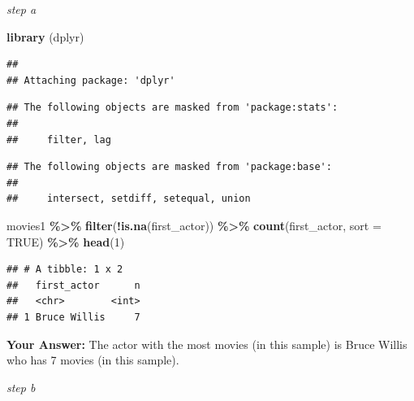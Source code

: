 \documentclass[
]{article}
\newenvironment{Shaded}{\begin{snugshade}}{\end{snugshade}}
\newcommand{\AttributeTok}[1]{\textcolor[rgb]{0.13,0.29,0.53}{#1}}
\newcommand{\ConstantTok}[1]{\textcolor[rgb]{0.56,0.35,0.01}{#1}}
\newcommand{\DecValTok}[1]{\textcolor[rgb]{0.00,0.00,0.81}{#1}}
\newcommand{\FunctionTok}[1]{\textcolor[rgb]{0.13,0.29,0.53}{\textbf{#1}}}
\newcommand{\NormalTok}[1]{#1}
\newcommand{\OtherTok}[1]{\textcolor[rgb]{0.56,0.35,0.01}{#1}}
\newcommand{\SpecialCharTok}[1]{\textcolor[rgb]{0.81,0.36,0.00}{\textbf{#1}}}
\newcommand{\StringTok}[1]{\textcolor[rgb]{0.31,0.60,0.02}{#1}}
\begin{document}
\emph{step a}

\begin{Shaded}
\begin{Highlighting}[]
\FunctionTok{library}\NormalTok{ (dplyr)}
\end{Highlighting}
\end{Shaded}

\begin{verbatim}
## 
## Attaching package: 'dplyr'
\end{verbatim}

\begin{verbatim}
## The following objects are masked from 'package:stats':
## 
##     filter, lag
\end{verbatim}

\begin{verbatim}
## The following objects are masked from 'package:base':
## 
##     intersect, setdiff, setequal, union
\end{verbatim}

\begin{Shaded}
\begin{Highlighting}[]
\NormalTok{movies1 }\SpecialCharTok{\%\textgreater{}\%}
  \FunctionTok{filter}\NormalTok{(}\SpecialCharTok{!}\FunctionTok{is.na}\NormalTok{(first\_actor)) }\SpecialCharTok{\%\textgreater{}\%}
  \FunctionTok{count}\NormalTok{(first\_actor, }\AttributeTok{sort =} \ConstantTok{TRUE}\NormalTok{) }\SpecialCharTok{\%\textgreater{}\%}
  \FunctionTok{head}\NormalTok{(}\DecValTok{1}\NormalTok{)}
\end{Highlighting}
\end{Shaded}

\begin{verbatim}
## # A tibble: 1 x 2
##   first_actor      n
##   <chr>        <int>
## 1 Bruce Willis     7
\end{verbatim}

\textbf{Your Answer:} The actor with the most movies (in this sample) is
Bruce Willis who has 7 movies (in this sample).

\emph{step b}

\begin{Shaded}
\end{Shaded}
\end{document}
